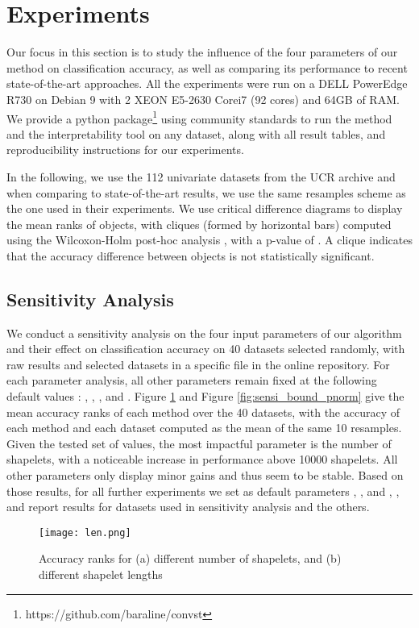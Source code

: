 \section{Experiments}
\label{sec:Experiments}
Our focus in this section is to study the influence of the four parameters of our method on classification accuracy, as well as comparing its performance to recent state-of-the-art approaches. All the experiments were run on a DELL PowerEdge R730 on Debian 9 with 2 XEON E5-2630 Corei7 (92 cores) and 64GB of RAM. We provide a python package\footnote{https://github.com/baraline/convst} using community standards to run the method and the interpretability tool on any dataset, along with all result tables, and reproducibility instructions for our experiments.

In the following, we use the 112 univariate datasets from the UCR archive \cite{Dataset} and when comparing to state-of-the-art results, we use the same resamples scheme as the one used in their experiments. We use critical difference diagrams to display the mean ranks of objects, with cliques (formed by horizontal bars) computed using the Wilcoxon-Holm post-hoc analysis \cite{CriticalDiagram}, with a p-value of . A clique indicates that the accuracy difference between objects is not statistically significant. 

\subsection{Sensitivity Analysis}
We conduct a sensitivity analysis on the four input parameters of our algorithm and their effect on classification accuracy on 40 datasets selected randomly, with raw results and selected datasets in a specific file in the online repository. 
For each parameter analysis, all other parameters remain fixed at the following default values : , , ,  and . Figure \ref{fig:sensi_len_nshp} and Figure \ref{fig:sensi_bound_pnorm} give the mean accuracy ranks of each method over the 40 datasets, with the accuracy of each method and each dataset computed as the mean of the same 10 resamples.
Given the tested set of values, the most impactful parameter is the number of shapelets, with a noticeable increase in performance above 10000 shapelets. All other parameters only display minor gains and thus seem to be stable. Based on those results, for all further experiments we set as default parameters , ,  and , , and report results for datasets used in sensitivity analysis and the others.

\begin{figure}[h]
  \texttt{[image: len.png]}
  \centering
  \caption{Accuracy ranks for (a) different number of shapelets, and (b) different shapelet lengths}
  \label{fig:sensi_len_nshp}
\end{figure}

